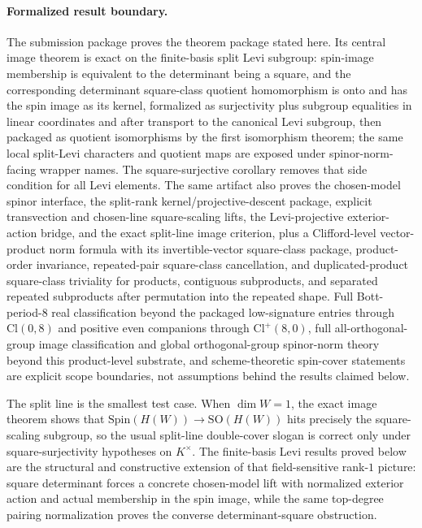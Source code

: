 \documentclass[11pt,a4paper]{article}
\theoremstyle{plain}
\theoremstyle{definition}
\theoremstyle{remark}
\newcommand{\Cl}{\mathrm{Cl}}
\newcommand{\Spin}{\mathrm{Spin}}
\newcommand{\SO}{\mathrm{SO}}
\begin{document}
\paragraph{Formalized result boundary.}
The submission package proves the theorem package stated here. Its central
image theorem is exact on the finite-basis split Levi subgroup: spin-image
membership is equivalent to the determinant being a square, and the
corresponding determinant square-class quotient homomorphism is onto and has the spin image
as its kernel, formalized as surjectivity plus subgroup equalities in linear coordinates and
after transport to the canonical Levi subgroup, then packaged as quotient isomorphisms by the
first isomorphism theorem; the same local split-Levi characters and quotient
maps are exposed under spinor-norm-facing wrapper names. The square-surjective corollary
removes that side condition for all Levi elements.
The same artifact also proves the chosen-model spinor interface, the split-rank
kernel/projective-descent package, explicit transvection and chosen-line
square-scaling lifts, the Levi-projective exterior-action bridge, and the exact
split-line image criterion, plus a Clifford-level vector-product norm formula
with its invertible-vector square-class package, product-order invariance,
repeated-pair square-class cancellation, and duplicated-product square-class
triviality for products, contiguous subproducts, and separated repeated
subproducts after permutation into the repeated shape.
Full Bott-period-$8$ real classification beyond
the packaged low-signature entries through $\Cl(0,8)$ and positive even companions
through $\Cl^+(8,0)$, full all-orthogonal-group image
classification and global orthogonal-group spinor-norm theory beyond this
product-level substrate, and scheme-theoretic spin-cover
statements are explicit scope boundaries, not assumptions behind the results
claimed below.

The split line is the smallest test case. When $\dim W=1$, the exact image
theorem shows that $\Spin(H(W)) \to \SO(H(W))$ hits precisely the
square-scaling subgroup, so the usual split-line double-cover slogan is correct
only under square-surjectivity hypotheses on $K^\times$. The finite-basis Levi
results proved below are the structural and constructive extension of that
field-sensitive rank-$1$ picture: square determinant forces a concrete
chosen-model lift with normalized exterior action and actual membership in the
spin image, while the same top-degree pairing normalization proves the converse
determinant-square obstruction.
\end{document}
